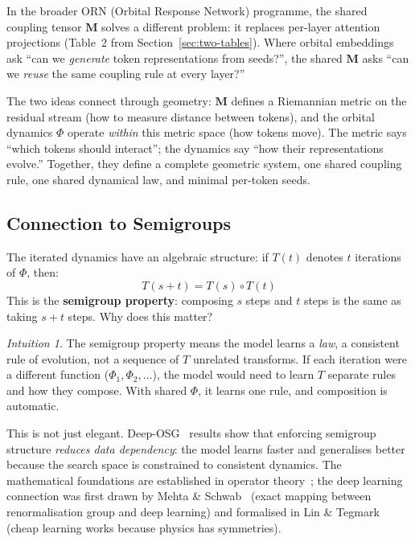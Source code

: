 \documentclass[11pt, a4paper]{article}
\newcommand{\M}{\mathbf{M}}
\theoremstyle{remark}
\newtheorem*{intuition}{Intuition}
\begin{document}
In the broader ORN (Orbital Response Network) programme, the shared coupling tensor $\M$ solves a different problem: it replaces per-layer attention projections (Table~2 from Section~\ref{sec:two-tables}).
Where orbital embeddings ask ``can we \emph{generate} token representations from seeds?'', the shared $\M$ asks ``can we \emph{reuse} the same coupling rule at every layer?''

The two ideas connect through geometry: $\M$ defines a Riemannian metric on the residual stream (how to measure distance between tokens), and the orbital dynamics $\Phi$ operate \emph{within} this metric space (how tokens move).
The metric says ``which tokens should interact''; the dynamics say ``how their representations evolve.''
Together, they define a complete geometric system, one shared coupling rule, one shared dynamical law, and minimal per-token seeds.

\subsection{Connection to Semigroups}

The iterated dynamics have an algebraic structure: if $T(t)$ denotes $t$ iterations of $\Phi$, then:
\[
    T(s + t) = T(s) \circ T(t)
\]
This is the \textbf{semigroup property}: composing $s$ steps and $t$ steps is the same as taking $s + t$ steps.
Why does this matter?

\begin{intuition}
The semigroup property means the model learns a \emph{law}, a consistent rule of evolution, not a sequence of $T$ unrelated transforms.
If each iteration were a different function ($\Phi_1, \Phi_2, \ldots$), the model would need to learn $T$ separate rules and how they compose.
With shared $\Phi$, it learns one rule, and composition is automatic.
\end{intuition}

This is not just elegant.
Deep-OSG~\cite{chen2023deeposg} results show that enforcing semigroup structure \emph{reduces data dependency}: the model learns faster and generalises better because the search space is constrained to consistent dynamics.
The mathematical foundations are established in operator theory~\cite{brunton2022data}; the deep learning connection was first drawn by Mehta \& Schwab~\cite{mehta2014} (exact mapping between renormalisation group and deep learning) and formalised in Lin \& Tegmark~\cite{lin2017} (cheap learning works because physics has symmetries).
\end{document}
